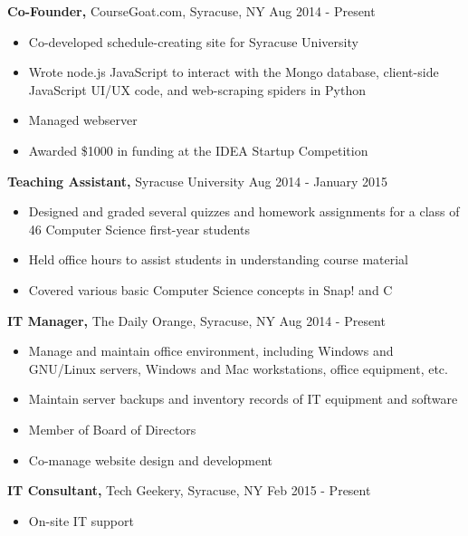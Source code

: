 \documentclass[margin]{res}
\begin{document}
\begin{resume}
 {\bf Co-Founder,} CourseGoat.com, Syracuse, NY \hfill
Aug 2014 - Present            
\begin{itemize} \itemsep -2pt
\item  Co-developed schedule-creating site for Syracuse University
\item Wrote node.js JavaScript to interact with the Mongo database, client-side JavaScript UI/UX code, and web-scraping spiders in Python
\item Managed webserver
\item Awarded \$1000 in funding at the IDEA Startup Competition
\end{itemize}

{\bf Teaching Assistant,} Syracuse University \hfill  Aug 2014 - January 2015
\begin{itemize} \itemsep -2pt %
\item Designed and graded several quizzes and homework assignments for a class of 46 Computer Science first-year students
\item Held office hours to assist students in understanding course material
\item Covered various basic Computer Science concepts in Snap! and C
\end{itemize}

 
{\bf IT Manager,} The Daily Orange, Syracuse, NY \hfill  Aug 2014 - Present
\begin{itemize} \itemsep -2pt %
\item Manage and maintain office environment, including Windows and GNU/Linux servers, Windows and Mac workstations, office equipment, etc.
\item Maintain server backups and inventory records of IT equipment and software
\item Member of Board of Directors
\item Co-manage website design and development
\end{itemize}

 {\bf IT Consultant,} Tech Geekery, Syracuse, NY \hfill  Feb 2015 - Present
\begin{itemize} \itemsep -2pt %
\item On-site IT support
\end{itemize}






 



\end{resume}
\end{document}
